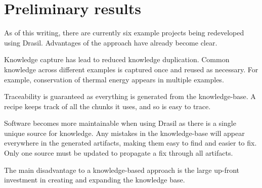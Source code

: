 \documentclass[twocolumn, 10pt]{article} %
\begin{document}
  
\section{Preliminary results}
As of this writing, there are currently six example projects being redeveloped
using Drasil. Advantages of the approach have already become clear.

Knowledge capture has lead to reduced knowledge duplication. Common knowledge
across different examples is captured once and reused as necessary. For example,
conservation of thermal energy appears in multiple examples.

Traceability is guaranteed as everything is generated from the knowledge-base. A
recipe keeps track of all the chunks it uses, and so is easy to trace.

Software becomes more maintainable when using Drasil as there is a single unique
source for knowledge. Any mistakes in the knowledge-base will appear everywhere
in the generated artifacts, making them easy to find and easier to fix. Only one
source must be updated to propagate a fix through all artifacts.

The main disadvantage to a knowledge-based approach is the large up-front investment in creating and expanding the knowledge base.



\end{document}
